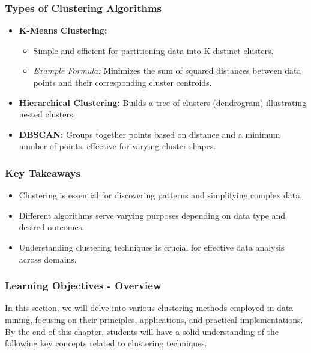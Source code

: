 \documentclass{beamer}
\begin{document}
\begin{frame}[fragile]
    \frametitle{Types of Clustering Algorithms}
    \begin{itemize}
        \item \textbf{K-Means Clustering:}
        \begin{itemize}
            \item Simple and efficient for partitioning data into K distinct clusters.
            \item \textit{Example Formula:} Minimizes the sum of squared distances between data points and their corresponding cluster centroids.
        \end{itemize}

        \item \textbf{Hierarchical Clustering:} 
        Builds a tree of clusters (dendrogram) illustrating nested clusters.

        \item \textbf{DBSCAN:} 
        Groups together points based on distance and a minimum number of points, effective for varying cluster shapes.
    \end{itemize}
\end{frame}

\begin{frame}[fragile]
    \frametitle{Key Takeaways}
    \begin{itemize}
        \item Clustering is essential for discovering patterns and simplifying complex data.
        \item Different algorithms serve varying purposes depending on data type and desired outcomes.
        \item Understanding clustering techniques is crucial for effective data analysis across domains.
    \end{itemize}
\end{frame}

\begin{frame}[fragile]
    \frametitle{Learning Objectives - Overview}
    In this section, we will delve into various clustering methods employed in data mining, focusing on their principles, applications, and practical implementations. 
    By the end of this chapter, students will have a solid understanding of the following key concepts related to clustering techniques.
\end{frame}
\end{document}
